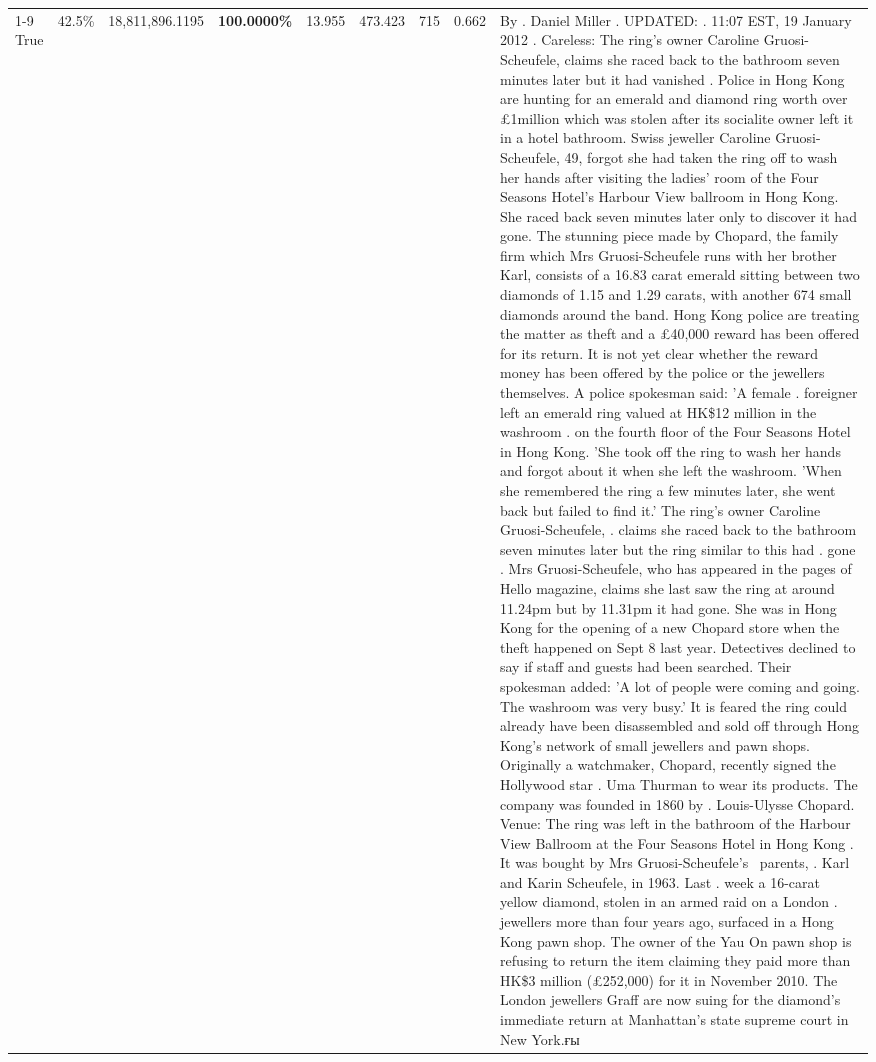 \begin{table}[H]
\begin{tabular}{lllrlllll}
\cline{1-9}
True & 42.5\% & 18,811,896.1195 & \bfseries \color{red} 100.0000\% & 13.955 & 473.423 & 715 & 0.662 & By . Daniel Miller . UPDATED: . 11:07 EST, 19 January 2012 . Careless: The ring's owner Caroline Gruosi-Scheufele, claims she raced back to the bathroom seven minutes later but it had vanished . Police in Hong Kong are hunting for an emerald and diamond ring worth over £1million which was stolen after its socialite owner left it in a hotel bathroom. Swiss jeweller Caroline Gruosi-Scheufele, 49, forgot she had taken the ring off to wash her hands after visiting the ladies' room of the Four Seasons Hotel's Harbour View ballroom in Hong Kong. She raced back seven minutes later only to discover it had gone. The stunning piece made by Chopard, the family firm which Mrs Gruosi-Scheufele runs with her brother Karl, consists of a 16.83 carat emerald sitting between two diamonds of 1.15 and 1.29 carats, with another 674 small diamonds around the band. Hong Kong police are treating the matter as theft and a £40,000 reward has been offered for its return. It is not yet clear whether the reward money has been offered by the police or the jewellers themselves. A police spokesman said: 'A female . foreigner left an emerald ring valued at HK\$12 million in the washroom . on the fourth floor of the Four Seasons Hotel in Hong Kong. 'She took off the ring to wash her hands and forgot about it when she left the washroom. 'When she remembered the ring a few minutes later, she went back but failed to find it.' The ring's owner Caroline Gruosi-Scheufele, . claims she raced back to the bathroom seven minutes later but the ring similar to this had . gone . Mrs Gruosi-Scheufele, who has appeared in the pages of Hello magazine, claims she last saw the ring at around 11.24pm but by 11.31pm it had gone. She was in Hong Kong for the opening of a new Chopard store when the theft happened on Sept 8 last year. Detectives declined to say if staff and guests had been searched. Their spokesman added: 'A lot of people were coming and going. The washroom was very busy.' It is feared the ring could already have been disassembled and sold off through Hong Kong's network of small jewellers and pawn shops. Originally a watchmaker, Chopard, recently signed the Hollywood star . Uma Thurman to wear its products. The company was founded in 1860 by . Louis-Ulysse Chopard. Venue: The ring was left in the bathroom of the Harbour View Ballroom at the Four Seasons Hotel in Hong Kong . It was bought by Mrs Gruosi-Scheufele's  parents, . Karl and Karin Scheufele, in 1963. Last . week a 16-carat yellow diamond, stolen in an armed raid on a London . jewellers more than four years ago, surfaced in a Hong Kong pawn shop. The owner of the Yau On pawn shop is refusing to return the item claiming they paid more than HK\$3 million (£252,000) for it in November 2010. The London jewellers Graff are now suing for the diamond’s immediate return at Manhattan’s state supreme court in New York.ғы \\

\end{tabular}
\end{table}
